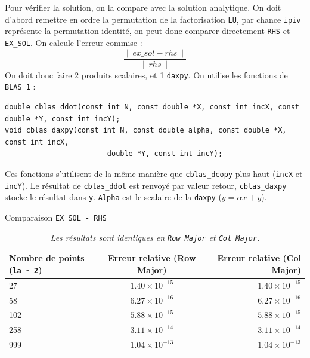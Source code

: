 \documentclass{article}
\begin{document}
Pour vérifier la solution, on la compare avec la solution analytique. On doit d'abord remettre en ordre la permutation de la factorisation \texttt{LU}, par chance \texttt{ipiv} représente la permutation identité, on peut donc comparer directement \texttt{RHS} et \texttt{EX\_SOL}. On calcule l'erreur commise :
\[
	\frac{\lVert ex\_sol - rhs \rVert}{\lVert rhs \rVert}
\]
On doit donc faire 2 produits scalaires, et 1 \texttt{daxpy}. On utilise les fonctions de \texttt{BLAS 1} :
\begin{scriptsize}
\begin{verbatim}
double cblas_ddot(const int N, const double *X, const int incX, const double *Y, const int incY);
void cblas_daxpy(const int N, const double alpha, const double *X, const int incX, 
						double *Y, const int incY);
\end{verbatim}
\end{scriptsize}
Ces fonctions s'utilisent de la même manière que \texttt{cblas\_dcopy} plus haut (\texttt{incX} et \texttt{incY}). Le résultat de \texttt{cblas\_ddot} est renvoyé par valeur retour, \texttt{cblas\_daxpy} stocke le résultat dans \texttt{y}.
\texttt{Alpha} est le scalaire de la \texttt{daxpy} (\(y = \alpha x + y\)).

\begin{table}[H]
\caption{Comparaison \texttt{EX\_SOL - RHS}}
\centering
\renewcommand*\arraystretch{1.1}
\begin{tabular}{|l|c|r|}
  \hline
  Nombre de points (\texttt{la - 2}) & Erreur relative (Row Major) & Erreur relative (Col Major) \\
  \hline
	27	&	\(1.40 \times 10^{-15}\)	&	\(1.40 \times 10^{-15}\)	\\
	58	&	\(6.27 \times 10^{-16}\)	&	\(6.27 \times 10^{-16}\)	\\
	102	&	\(5.88 \times 10^{-15}\)	&	\(5.88 \times 10^{-15}\)	\\
	258	&	\(3.11 \times 10^{-14}\)	&	\(3.11 \times 10^{-14}\)	\\
	999	&	\(1.04 \times 10^{-13}\)	&	\(1.04 \times 10^{-13}\)	\\
  \hline
\end{tabular}
\caption*{\textit{Les résultats sont identiques en \texttt{Row Major} et \texttt{Col Major}.}}
\end{table}
\end{document}
